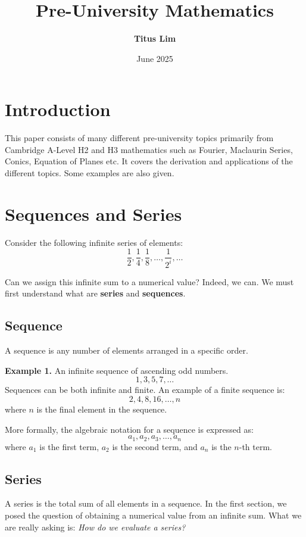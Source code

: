 \documentclass[12pt]{article}
\title{Pre-University Mathematics}
\author{\textbf{Titus Lim}}
\date{June 2025}
\begin{document}
\begin{titlingpage}
	\maketitle
\end{titlingpage}

\tableofcontents
\newpage

\section*{Introduction}

This paper consists of many different pre-university topics primarily from Cambridge A-Level H2 and H3 mathematics such as Fourier, Maclaurin Series, Conics, Equation of Planes etc.
It covers the derivation and applications of the different topics. Some examples are also given.

\section{Sequences and Series}

Consider the following infinite series of elements:
\[
	\frac{1}{2}, \frac{1}{4}, \frac{1}{8},\dots,\frac{1}{2^{i}},\dots
\]

Can we assign this infinite sum to a numerical value? Indeed, we can. We must first understand what are \textbf{series} and \textbf{sequences}.

\subsection{Sequence}

A sequence is any number of elements arranged in a specific order.

\textbf{Example 1.} An infinite sequence of ascending odd numbers.
\[
	1, 3, 5, 7, \dots
\]
Sequences can be both infinite and finite. An example of a finite sequence is:
\[
	2, 4, 8, 16, \dots, n
\]
where $n$ is the final element in the sequence.

More formally, the algebraic notation for a sequence is expressed as:
\[
	a_1, a_2, a_3, \dots, a_n
\]
where $a_1$ is the first term, $a_2$ is the second term, and $a_n$ is the $n$-th term.

\subsection{Series}

A series is the total sum of all elements in a sequence. In the first section, we posed the question of obtaining a numerical value from an infinite sum. What we are really asking is: \textit{How do we evaluate a series?}
\end{document}
